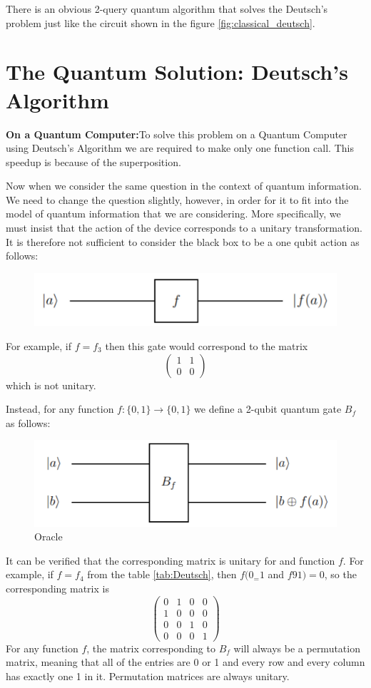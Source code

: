 \documentclass[12pt, oneside]{book}
\theoremstyle{definition}
\theoremstyle{definition}
\theoremstyle{remark}
\begin{document}
There is an obvious 2-query quantum algorithm that solves the Deutsch's problem just like the circuit shown in the figure \ref{fig:classical_deutsch}.
\section{The Quantum Solution: Deutsch's Algorithm}
\textbf{On a Quantum Computer:}To solve this problem on a Quantum Computer using Deutsch's Algorithm we are required to make only one function call. This speedup is because of the superposition.

Now when we consider the same question in the context of quantum information. We need to change the question slightly, however, in order for it to fit into the model of quantum information that we are considering. More specifically, we must insist that the action of the device corresponds to a unitary transformation. It is therefore not sufficient to consider the black box to be a one qubit action as follows:
\begin{figure}[H]
    \centering
    \includegraphics[width=1\linewidth]{../images/Deutsch_bb.png}
    \label{fig:enter-label}
\end{figure}
For example, if $f=f_3$ then this gate would correspond to the matrix
\[
\begin{pmatrix} 1 & 1 \\ 0 & 0 \end{pmatrix}
\]
which is not unitary.

Instead, for any function $f:\{0,1\}\rightarrow\{0,1\}$ we define a 2-qubit quantum gate $B_f$ as follows:
\begin{figure}[H]
    \centering
    \includegraphics[width=1\linewidth]{../images/deutsch_oracle.png}
    \caption{Oracle}
    \label{fig:deutsch_oracle}
\end{figure}
It can be verified that the corresponding matrix is unitary for and function $f$. For example, if $f=f_4$ from the table \ref{tab:Deutsch}, then $f(0_=1$ and $f91)=0$, so the corresponding matrix is
\[
\begin{pmatrix} 0 & 1 & 0 & 0 \\1 & 0 & 0 & 0\\ 0 & 0 & 1 & 0 \\ 0 & 0 & 0 & 1 \end{pmatrix}
\]
For any function $f$, the matrix corresponding to $B_f$ will always be a permutation matrix, meaning that all of the entries are 0 or 1 and every row and every column has exactly one 1 in it. Permutation matrices are always unitary.
\end{document}
